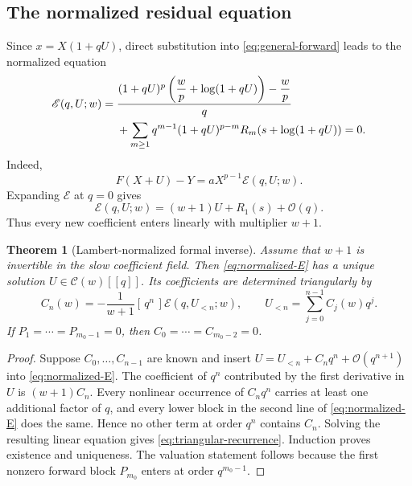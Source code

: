 \documentclass[11pt,a4paper]{article}
\numberwithin{equation}{section}
\newtheorem{theorem}{Theorem}[section]
\theoremstyle{definition}
\theoremstyle{remark}
\newcommand{\Ord}{\mathcal O}
\newcommand{\coeff}[2]{[\,#1^{#2}\,]}
\newcommand{\Cfield}{\mathscr C}
\begin{document}
\subsection{The normalized residual equation}

Since \(x=X(1+qU)\), direct substitution into \cref{eq:general-forward}
leads to the normalized equation
\begin{align}
 \mathscr E(q,U;w)={}&
 \frac{(1+qU)^p\left(\dfrac wp+\log(1+qU)\right)-\dfrac wp}{q}
 \notag\\
 &+\sum_{m\ge1}q^{m-1}(1+qU)^{p-m}
 R_m\!\left(s+\log(1+qU)\right)=0.
 \label{eq:normalized-E}
\end{align}
Indeed,
\begin{equation}
 F(X+U)-Y=aX^{p-1}\mathscr E(q,U;w).
 \label{eq:residual-scale}
\end{equation}
Expanding \(\mathscr E\) at \(q=0\) gives
\begin{equation}
 \mathscr E(q,U;w)=(w+1)U+R_1(s)+\Ord(q).
 \label{eq:E-leading}
\end{equation}
Thus every new coefficient enters linearly with multiplier \(w+1\).

\begin{theorem}[Lambert-normalized formal inverse]\label{thm:formal-inverse}
Assume that \(w+1\) is invertible in the slow coefficient field.  Then
\cref{eq:normalized-E} has a unique solution
\(U\in\Cfield(w)[[q]]\).  Its coefficients are determined triangularly by
\begin{equation}
 C_n(w)=-\frac1{w+1}
 \coeff qn{\mathscr E\!\left(q,U_{<n};w\right)},
 \qquad
 U_{<n}=\sum_{j=0}^{n-1}C_j(w)q^j.
 \label{eq:triangular-recurrence}
\end{equation}
If \(P_1=\cdots=P_{m_0-1}=0\), then
\(C_0=\cdots=C_{m_0-2}=0\).
\end{theorem}

\begin{proof}
Suppose \(C_0,\ldots,C_{n-1}\) are known and insert
\(U=U_{<n}+C_nq^n+\Ord(q^{n+1})\) into \cref{eq:normalized-E}.  The
coefficient of \(q^n\) contributed by the first derivative in \(U\) is
\((w+1)C_n\).  Every nonlinear occurrence of \(C_nq^n\) carries at least
one additional factor of \(q\), and every lower block in the second line
of \cref{eq:normalized-E} does the same.  Hence no other term at order
\(q^n\) contains \(C_n\).  Solving the resulting linear equation gives
\cref{eq:triangular-recurrence}.  Induction proves existence and
uniqueness.  The valuation statement follows because the first nonzero
forward block \(P_{m_0}\) enters at order \(q^{m_0-1}\).
\end{proof}
\end{document}
